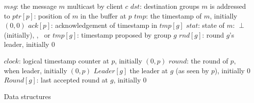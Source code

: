 
\begin{algorithm}
\footnotesize

\begin{distribalgo}[1]

\vspace{1.0mm}
	\STATE $msg$: the message $m$ multicast by client $c$
	\STATE $dst$: destination groups $m$ is addressed to
	\STATE $ptr[p]$: position of $m$ in the buffer at $p$
	\STATE $tmp$: the timestamp of $m$, initially $(0,0)$
	\STATE $ack[p]$: acknowledgement of timestamp in $tmp[g]$
	\STATE $stat$: state of $m$: $\perp$ (initially), \mcast, \ordered\ or \done
\ENDINDENT
\vspace{1.0mm}
	\STATE $tmp[g]$: timestamp proposed by group $g$
	\STATE $rnd[g]$: round $g$'s leader, initially 0
\ENDINDENT
\vspace{1.0mm}
\vspace{1.0mm}

	\STATE $clock$: logical timestamp counter at $p$, initially $(0,p)$
	\STATE $round$: the round of $p$, when leader, initially $(0,p)$
	\STATE $Leader[g]$ the leader at $g$ (as seen by $p$), initially 0
	\STATE $Round[g]$: last accepted round at $g$, initially 0
\ENDINDENT

\vspace{2.0mm}

%


\caption{Data structures}
\label{alg:data_struct}
\end{distribalgo}
\end{algorithm}

